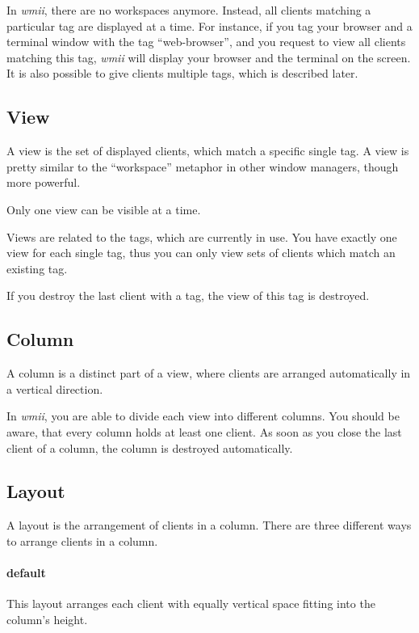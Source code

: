 \documentclass[12pt,a4paper]{article} %
\newcommand{\wmii}{\emph{wmii}}
\begin{document}
    In \wmii, there are no workspaces anymore. Instead, all clients matching a
    particular tag are displayed at a time.  For instance, if you tag your
    browser and a terminal window with the tag ``web-browser'', and you request
    to view all clients matching this tag, \wmii{} will display your browser
    and the terminal on the screen.
    It is also possible to give clients multiple tags, which is described later.

    \subsection{View}

    A view is the set of displayed clients, which match a specific single tag.
    A view is pretty similar to the ``workspace'' metaphor in other window
    managers, though more powerful.

    Only one view can be visible at a time.

    Views are related to the tags, which are currently in use. You have exactly
    one view for each single tag, thus you can only view sets of clients which
    match an existing tag.

    If you destroy the last client with a tag, the view of this tag is
    destroyed.

    \subsection{Column}

    A column is a distinct part of a view, where clients are arranged
    automatically in a vertical direction.

    In \wmii, you are able to divide each view into different columns.
    You should be aware, that every column holds at least one client.
    As soon as you close the last client of a column, the column is
    destroyed automatically.


    \subsection{Layout}

    A layout is the arrangement of clients in a column.
    There are three different ways to arrange clients in a column.
    \paragraph{default} This layout arranges each client with
    equally vertical space fitting into the column's height.
\end{document}
